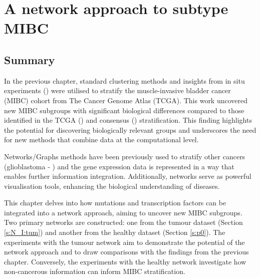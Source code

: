 \section{A network approach to subtype MIBC}


\vspace{3mm}
\vspace{3mm}


\subsection{Summary}

In the previous chapter, standard clustering methods and insights from in situ experiments (\citet{Baker2022-bj}) were utilised to stratify the muscle-invasive bladder cancer (MIBC) cohort from The Cancer Genome Atlas (TCGA). This work uncovered new MIBC subgroups with significant biological differences compared to those identified in the TCGA (\citet{Robertson2017-mg}) and consensus (\citet{Kamoun2020-tj}) stratification. This finding highlights the potential for discovering biologically relevant groups and underscores the need for new methods that combine data at the computational level.

Networks/Graphs methods have been previously used to stratify other cancers (glioblastoma - \citet{Care2019-ij}) and the gene expression data is represented in a way that enables further information integration.  Additionally, networks serve as powerful visualisation tools, enhancing the biological understanding of diseases.


This chapter delves into how mutations and transcription factors can be integrated into a network approach, aiming to uncover new MIBC subgroups. Two primary networks are constructed: one from the tumour dataset (Section \ref{s:N_I:tum}) and another from the healthy dataset (Section \ref{s:p0}). The experiments with the tumour network aim to demonstrate the potential of the network approach and to draw comparisons with the findings from the previous chapter. Conversely, the experiments with the healthy network investigate how non-cancerous information can inform MIBC stratification.

